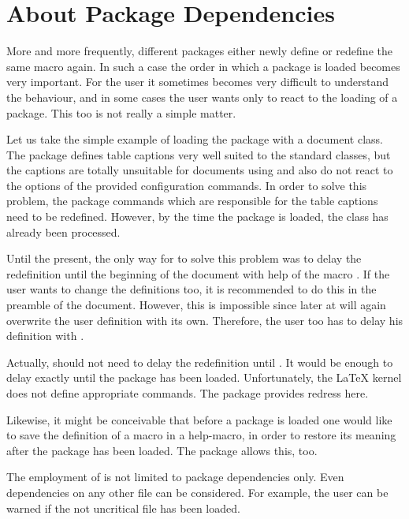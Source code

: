 \section{About Package Dependencies}

More and more frequently, different packages either newly define or
redefine the same macro again.  In such a case the order in which a
package is loaded becomes very important.  For the user it sometimes
becomes very difficult to understand the behaviour, and in some
cases the user wants only to react to the loading of a package. This
too is not really a simple matter.

Let us take the simple example of loading the package  with
a {\KOMAScript} document class.  The  package defines table
captions very well suited to the standard classes, but the captions are
totally unsuitable for documents using {\KOMAScript} and also do not react to
the options of the provided configuration commands.  In order to solve this
problem, the  package commands which are responsible for
the table captions need to be redefined. However, by the time the
 package is loaded, the {\KOMAScript} class has already
been processed.

Until the present, the only way for {\KOMAScript} to solve this problem was to
delay the redefinition until the beginning of the document with help of the
macro .  If the user wants to change the definitions
too, it is recommended to do this in the preamble of the document.  However,
this is impossible since later at 
{\KOMAScript} will again overwrite the user definition with its own.
Therefore, the user too has to delay his definition with
.
  
Actually, {\KOMAScript} should not need to delay the redefinition until
.  It would be enough to delay exactly until
the package  has been loaded. Unfortunately, the {\LaTeX}
kernel does not define appropriate commands. The package 
provides redress here.
  
Likewise, it might be conceivable that before a package is loaded one would
like to save the definition of a macro in a help-macro, in order to restore
its meaning after the package has been loaded. The package 
allows this, too.
  
The employment of  is not limited to package dependencies
only.  Even dependencies on any other file can be considered.  For example,
the user can be warned if the not uncritical file  has been
loaded.
  

